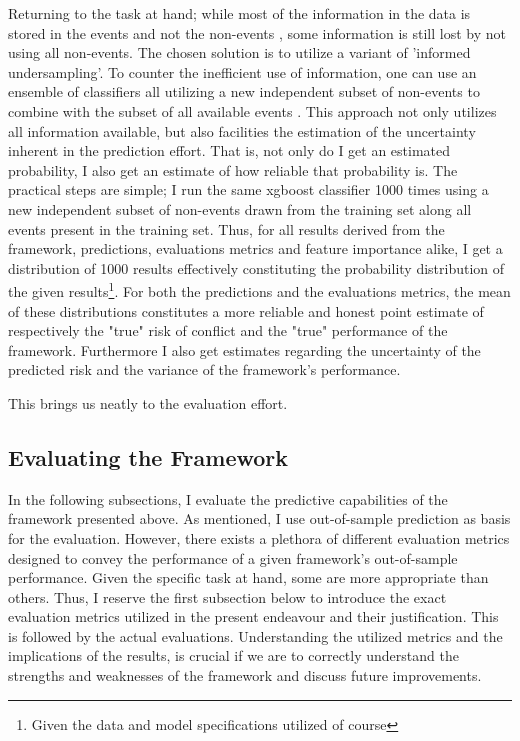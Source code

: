 \documentclass[a4paper]{article}
\begin{document}
Returning to the task at hand; while most of the information in the data is stored in the events and not the non-events \cite[139]{King_Zeng_2001}, some information is still lost by not using all non-events. The chosen solution is to utilize a variant of 'informed undersampling'. To counter the inefficient use of information, one can use an ensemble of classifiers all utilizing a new independent subset of non-events to combine with the subset of all available events \cite[1267]{He_2008}. This approach not only utilizes all information available, but also facilities the estimation of the uncertainty inherent in the prediction effort. That is, not only do I get an estimated probability, I also get an estimate of how reliable that probability is. The practical steps are simple; I run the same xgboost classifier 1000 times using a new independent subset of non-events drawn from the training set along all events present in the training set. Thus, for all results derived from the framework, predictions, evaluations metrics and feature importance alike, I get a distribution of 1000 results effectively constituting the probability distribution of the given results\footnote{Given the data and model specifications utilized of course}. For both the predictions and the evaluations metrics, the mean of these distributions constitutes a more reliable and honest point estimate of respectively the "true" risk of conflict and the "true" performance of the framework. Furthermore I also get estimates regarding the uncertainty of the predicted risk and the variance of the framework's performance.\par

This brings us neatly to the evaluation effort.\par

\subsection{Evaluating the Framework}
In the following subsections, I evaluate the predictive capabilities of the framework presented above. As mentioned, I use out-of-sample prediction as basis for the evaluation. However, there exists a plethora of different evaluation metrics designed to convey the performance of a given framework's out-of-sample performance. Given the specific task at hand, some are more appropriate than others. Thus, I reserve the first subsection below to introduce the exact evaluation metrics utilized in the present endeavour and their justification. This is followed by the actual evaluations. Understanding the utilized metrics and the implications of the results, is crucial if we are to correctly understand the strengths and weaknesses of the framework and discuss future improvements.\par
\end{document}
